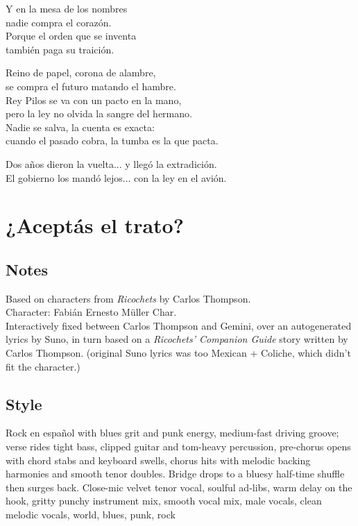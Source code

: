\begin{lyrics}
Y en la mesa de los nombres\\
nadie compra el corazón.\\
Porque el orden que se inventa\\
también paga su traición.

Reino de papel, corona de alambre,\\
se compra el futuro matando el hambre.\\
Rey Pilos se va con un pacto en la mano,\\
pero la ley no olvida la sangre del hermano.\\
Nadie se salva, la cuenta es exacta:\\
cuando el pasado cobra, la tumba es la que pacta.

Dos años dieron la vuelta... y llegó la extradición.\\
El gobierno los mandó lejos... con la ley en el avión.

\end{lyrics}

\section{¿Aceptás el trato?}

\subsection{Notes}
Based on characters from \emph{Ricochets} by Carlos Thompson.\\
Character: Fabián Ernesto Müller Char.\\
Interactively fixed between Carlos Thompson and Gemini, over an autogenerated lyrics by Suno, in turn based on a \emph{Ricochets' Companion Guide} story written by Carlos Thompson. (original Suno lyrics was too Mexican + Coliche, which didn't fit the character.)

\subsection{Style}
Rock en español with blues grit and punk energy, medium-fast driving groove; verse rides tight bass, clipped guitar and tom-heavy percussion, pre-chorus opens with chord stabs and keyboard swells, chorus hits with melodic backing harmonies and smooth tenor doubles. Bridge drops to a bluesy half-time shuffle then surges back. Close-mic velvet tenor vocal, soulful ad-libs, warm delay on the hook, gritty punchy instrument mix, smooth vocal mix, male vocals, clean melodic vocals, world, blues, punk, rock

